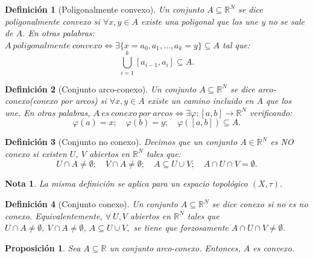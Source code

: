 \documentclass[11pt, a4paper, titlepage]{article}
\theoremstyle{theorem-style}
\newtheorem*{nprop}{Proposición}
\theoremstyle{definition-style}
\newtheorem*{ndef}{Definición}
\theoremstyle{remark-style}
\newtheorem*{nota}{Nota}
\theoremstyle{example-style}
\begin{document}
\begin{ndef}[Poligonalmente convexo]
Un conjunto $A\subseteq \mathbb{R}^N$ se dice \textit{poligonalmente convexo} si  $\forall x,y \in A$ existe una poligonal que los une y no se sale de $A$. En otras palabras:  $A\ poligonalmente\ convexo \iff \exists \{x= a_0, a_1,\dots,a_k=y \}\subseteq A$ tal que: $$\bigcup_{i=1}^k [a_{i-1},a_i] \subseteq A.$$
\end{ndef}



\begin{ndef}[Conjunto arco-conexo]
Un conjunto $A \subseteq \mathbb{R}^N$ se dice \emph{arco-conexo(conexo por arcos)} si $\forall x,y \in A$ existe un camino incluido en $A$ que los une. En otras palabras,  $A\ es\ conexo\ por\ arcos \iff \exists \varphi:[a,b] \longrightarrow \mathbb{R}^N$ verificando: $$\varphi(a) = x;\quad \varphi(b) = y;\quad \varphi([a,b]) \subseteq A.$$
\end{ndef}



\begin{ndef}[Conjunto no conexo]
Decimos que un conjunto $A\in \mathbb{R}^N$ es \textit{NO conexo} si existen $U,\ V$ abiertos en $\mathbb{R}^N$ tales que: $$U \cap A \ne \emptyset;\quad V \cap A \ne \emptyset;\quad A \subseteq U \cup V;\quad A \cap U \cap V = \emptyset.$$
\end{ndef}



\begin{nota}
La misma definición se aplica para un espacio topológico $(X,\tau).$
\end{nota}



\begin{ndef}[Conjunto conexo]
Un conjunto $A\subseteq \mathbb{R}^N$ se dice conexo si no es no conexo. Equivalentemente, $\forall \ U,V$ abiertos en $\mathbb{R}^N$ tales que $U \cap A \ne \emptyset, \ V \cap A \ne \emptyset,\ A \subseteq U \cup V,$ se tiene que forzosamente $A \cap U \cap V \ne \emptyset$.
\end{ndef}



\begin{nprop}
Sea $A\subseteq \mathbb{R}$ un conjunto arco-conexo. Entonces, $A$ es convexo.
\end{nprop}
\end{document}
